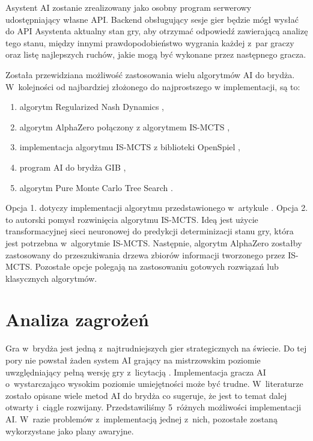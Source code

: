 Asystent AI zostanie zrealizowany jako osobny program serwerowy
udostępniający własne API. Backend obsługujący sesje gier
będzie mógł wysłać do API Asystenta aktualny stan gry, aby otrzymać
odpowiedź zawierającą analizę tego stanu, między innymi
prawdopodobieństwo wygrania każdej z~par graczy oraz listę
najlepszych ruchów, jakie mogą być wykonane przez następnego gracza.

Została przewidziana możliwość zastosowania wielu algorytmów AI
do brydża. W~kolejności od najbardziej złożonego do
najprostszego w implementacji, są to:
\begin{enumerate}
  \item algorytm Regularized Nash Dynamics \cite{doi:10.1126/science.add4679},
  \item algorytm AlphaZero \cite{Silver2017MasteringCA} połączony
        z algorytmem IS-MCTS \cite{6203567},
  \item implementacja algorytmu IS-MCTS z biblioteki OpenSpiel \cite{LanctotEtAl2019OpenSpiel},
  \item program AI do brydża GIB \cite{Ginsberg1999GIBST},
  \item algorytm Pure Monte Carlo Tree Search \cite{pmcts}.
\end{enumerate}

Opcja 1. dotyczy implementacji algorytmu przedstawionego w~artykule
\cite{doi:10.1126/science.add4679}.
Opcja 2. to autorski pomysł rozwinięcia algorytmu IS-MCTS.
Ideą jest użycie transformacyjnej sieci neuronowej do predykcji
determinizacji stanu gry, która jest potrzebna w~algorytmie IS-MCTS.
Następnie, algorytm AlphaZero zostałby zastosowany do przeszukiwania
drzewa zbiorów informacji tworzonego przez IS-MCTS.
Pozostałe opcje polegają na zastosowaniu gotowych rozwiązań lub
klasycznych algorytmów.


\section{Analiza zagrożeń}

Gra w~brydża jest jedną z~najtrudniejszych gier strategicznych na świecie.
Do tej pory nie powstał żaden system AI grający na mistrzowskim poziomie
uwzględniający pełną wersję gry z~licytacją \cite{Bethe2021AdvancesIC}.
Implementacja gracza AI o~wystarczająco wysokim poziomie umiejętności może być
trudne. W~literaturze zostało opisane wiele metod AI do brydża
\cite{Zhang2019DesignAD,Zhang2022TheSO,Zhang2022AIEB,Ginsberg1999GIBST}
co sugeruje, że jest to temat dalej otwarty i~ciągle rozwijany.
Przedstawiliśmy 5~różnych możliwości implementacji AI.
W~razie problemów z~implementacją jednej z~nich, pozostałe
zostaną wykorzystane jako plany awaryjne.

